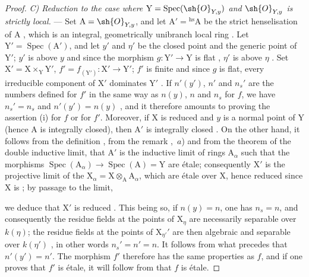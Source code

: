 \begin{proof}
\emph{C) Reduction to the case where $\mathrm{Y}=\operatorname{Spec}(\sh{O}_{Y,y})$ and $\sh{O}_{Y,y}$ is strictly local.} ---
Set $\mathrm{A}=\sh{O}_{Y,y}$, and let $\mathrm{A}'={}^{\mathrm{hs}}\mathrm{A}$ be the strict henselisation of $\mathrm{A}$ , which is an integral, geometrically unibranch local ring .
Let $\mathrm{Y}'=\operatorname{Spec}(\mathrm{A}')$, and let $y'$ and $\eta'$ be the closed point and the generic point of $\mathrm{Y}'$; $y'$ is above $y$ and since the morphism $g:\mathrm{Y}'\to\mathrm{Y}$ is flat , $\eta'$ is above $\eta$ .
Set $\mathrm{X}'=\mathrm{X}\times_{\mathrm{Y}}\mathrm{Y}'$, $f'=f_{(\mathrm{Y}')}:\mathrm{X}'\to\mathrm{Y}'$; $f'$ is finite and since $g$ is flat, every irreducible component of $\mathrm{X}'$ dominates $\mathrm{Y}'$ .
If $n'(y')$, $n'$ and $n_s'$ are the numbers defined for $f'$ in the same way as $n(y)$, $n$ and $n_s$ for $f$, we have $n_s'=n_s$ and $n'(y')=n(y)$ , and it therefore amounts to proving the assertion (i) for $f$ or for $f'$.
Moreover, if $\mathrm{X}$ is reduced and $y$ is a normal point of $\mathrm{Y}$ (hence $\mathrm{A}$ is integrally closed), then $\mathrm{A}'$ is integrally closed .
On the other hand, it follows from the definition , from the remark ,~$a$) and from the theorem of the double inductive limit, that $\mathrm{A}'$ is the inductive limit of rings $\mathrm{A}_\alpha$ such that the morphisms $\operatorname{Spec}(\mathrm{A}_\alpha)\to\operatorname{Spec}(\mathrm{A})=\mathrm{Y}$ are \'etale; consequently $\mathrm{X}'$ is the projective limit of the $\mathrm{X}_\alpha=\mathrm{X}\otimes_{\mathrm{A}}\mathrm{A}_\alpha$, which are \'etale over $\mathrm{X}$, hence reduced since $\mathrm{X}$ is ; by passage to the limit,


we deduce that $\mathrm{X}'$ is reduced .
This being so, if $n(y)=n$, one has $n_s=n$, and consequently the residue fields at the points of $\mathrm{X}_\eta$ are necessarily separable over $k(\eta)$; the residue fields at the points of $\mathrm{X}_{\eta'}'$ are then algebraic and separable over $k(\eta')$ , in other words $n_s'=n'=n$. It follows from what precedes that $n'(y')=n'$.
The morphism $f'$ therefore has the same properties as $f$, and if one proves that $f'$ is \'etale, it will follow from  that $f$ is \'etale.


\end{proof}
